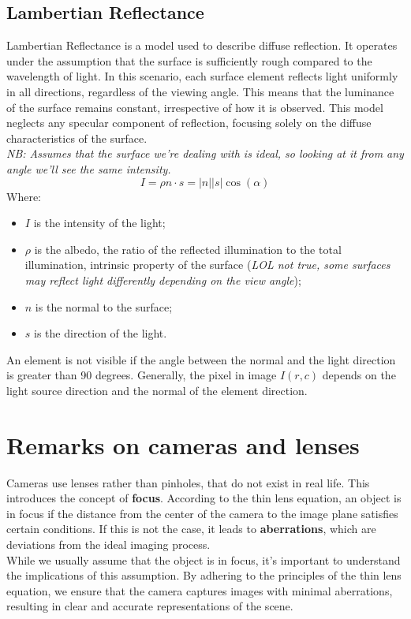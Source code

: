 \subsection{Lambertian Reflectance}
Lambertian Reflectance is a model used to describe diffuse reflection. It operates under the assumption that the surface is sufficiently rough compared to the wavelength of light. In this scenario, each surface element reflects light uniformly in all directions, regardless of the viewing angle. This means that the luminance of the surface remains constant, irrespective of how it is observed. 
This model neglects any specular component of reflection, focusing solely on the diffuse characteristics of the surface.
\\\textit{NB: Assumes that the surface we're dealing with is ideal, so looking at it from any angle we'll see the same intensity.}
\[
    I = \rho n \cdot s = |n||s|\cos(\alpha) 
\]
Where:
\begin{itemize}
    \item $I$ is the intensity of the light;
    \item $\rho$ is the albedo, the ratio of the reflected illumination to the total illumination, intrinsic property of the surface (\textit{LOL not true, some surfaces may reflect light differently depending on the view angle});
    \item $n$ is the normal to the surface;
    \item $s$ is the direction of the light.
\end{itemize}

An element is not visible if the angle between the normal and the light direction is greater than 90 degrees.
Generally, the pixel in image $I(r,c)$ depends on the light source direction and the normal of the element direction.

\section{Remarks on cameras and lenses}
Cameras use lenses rather than pinholes, that do not exist in real life. This introduces the concept of \textbf{focus}. 
According to the thin lens equation, an object is in focus if the distance from the center of the camera to the image plane satisfies certain conditions. 
If this is not the case, it leads to \textbf{aberrations}, which are deviations from the ideal imaging process.
\\
While we usually assume that the object is in focus, it's important to understand the implications of this assumption. 
By adhering to the principles of the thin lens equation, we ensure that the camera captures images with minimal aberrations, resulting in clear and accurate representations of the scene.
